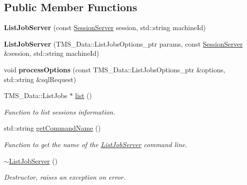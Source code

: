 \subsection*{Public Member Functions}
\begin{DoxyCompactItemize}
\item 
\hypertarget{classListJobServer_aca3cea95317efb694e70d98353ad9e15}{
{\bfseries ListJobServer} (const \hyperlink{classSessionServer}{SessionServer} session, std::string machineId)}
\label{classListJobServer_aca3cea95317efb694e70d98353ad9e15}

\item 
\hypertarget{classListJobServer_a201cfa0d8b9c3fbedc1224a3a5fbeaa5}{
{\bfseries ListJobServer} (TMS\_\-Data::ListJobsOptions\_\-ptr params, const \hyperlink{classSessionServer}{SessionServer} \&session, std::string machineId)}
\label{classListJobServer_a201cfa0d8b9c3fbedc1224a3a5fbeaa5}

\item 
\hypertarget{classListJobServer_aee4778e1bc0d87018454dcfb9cd5a915}{
void {\bfseries processOptions} (const TMS\_\-Data::ListJobsOptions\_\-ptr \&options, std::string \&sqlRequest)}
\label{classListJobServer_aee4778e1bc0d87018454dcfb9cd5a915}

\item 
TMS\_\-Data::ListJobs $\ast$ \hyperlink{classListJobServer_abd6c94b777cdce434fafb95b5b9fc764}{list} ()
\begin{DoxyCompactList}\small\item\em Function to list sessions information. \item\end{DoxyCompactList}\item 
std::string \hyperlink{classListJobServer_ae4efce66451934990d0575d1b8151378}{getCommandName} ()
\begin{DoxyCompactList}\small\item\em Function to get the name of the \hyperlink{classListJobServer}{ListJobServer} command line. \item\end{DoxyCompactList}\item 
\hypertarget{classListJobServer_abf137539e02fc0d6f0d288d1b76cd58b}{
\hyperlink{classListJobServer_abf137539e02fc0d6f0d288d1b76cd58b}{$\sim$ListJobServer} ()}
\label{classListJobServer_abf137539e02fc0d6f0d288d1b76cd58b}

\begin{DoxyCompactList}\small\item\em Destructor, raises an exception on error. \item\end{DoxyCompactList}\end{DoxyCompactItemize}

